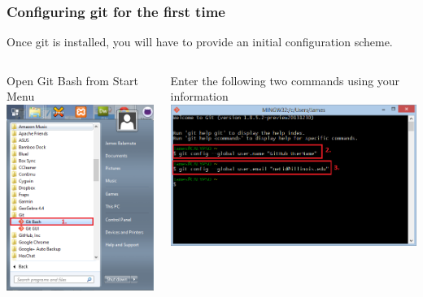 \documentclass{beamer}\usepackage[]{graphicx}\usepackage[]{color}
\begin{document}
\begin{frame}[fragile]
\frametitle{Configuring git for the first time}

Once git is installed, you will have to provide an initial configuration scheme.

\begin{columns}[t]
\centering
\begin{block}{Open Git Bash from Start Menu}
\centering
\includegraphics[scale=0.32]{img/git/select_git_bash.png}
\end{block}
\centering
\begin{block}{Enter the following two commands using your information}
\centering
\includegraphics[scale=0.36]{img/git/git_global_config.png}
\end{block}
\end{columns}

\end{frame}
\end{document}
